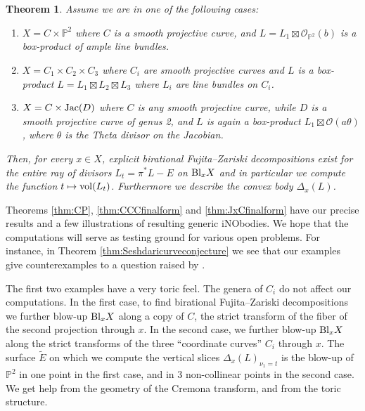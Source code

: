 \documentclass[12pt]{amsart}
\newtheorem{theorem}[lemma]{Theorem}
\theoremstyle{definition}
\newcommand{\bb}{\ensuremath{\mathfrak{b}}}
\newcommand{\nob}[2]{\ensuremath{\Delta_{#1}(#2)}}
\newcommand{\inob}[2]{\ensuremath{{\Delta}_{#1}(#2)}}
\newcommand{\?}{ \circled{{\large\bf ?}}}
\let\cal\mathcal
\let\bb\mathbb
\begin{document}
\begin{theorem}
	Assume we are in one of the following cases:
	\begin{enumerate}
		\item $X=C\times\bb P^2$ where $C$ is a smooth projective curve, and $L=L_1\boxtimes\cal O_{\bb P^2}(b)$ is a box-product of ample line bundles.
		\smallskip
		
		\item $X=C_1\times C_2\times C_3$ where $C_i$ are smooth projective curves and $L$ is a box-product $L=L_1\boxtimes L_2\boxtimes L_3$ where $L_i$ are line bundles on $C_i$.
		\smallskip
		
		\item $X=C\times {\rm Jac}(D)$ where $C$ is any smooth projective curve, while $D$ is a smooth projective curve of genus 2, and $L$ is again a box-product $L_1\boxtimes \cal O(a\theta)$, where $\theta$ is the Theta divisor on the Jacobian.
	\end{enumerate}
Then, for every $x\in X$, explicit birational Fujita--Zariski decompositions exist for the entire ray of divisors $L_t=\pi^*L-E$ on ${\rm Bl}_xX$ and in particular we compute the function $t\mapsto{\rm vol}(L_t)$. Furthermore we describe the convex body $\inob{x}{L}$. 
\end{theorem}


Theorems \ref{thm:CP}, \ref{thm:CCCfinalform} and \ref{thm:JxCfinalform} have our precise results and a few illustrations of resulting generic iNObodies. We hope that the computations will serve as testing ground for various open problems. For instance, in Theorem \ref{thm:Seshdaricurveconjecture} we see that our examples give counterexamples to a question raised by \cite{FLgeneralities}.

The first two examples have a very toric feel. The genera of $C_i$ do not affect our computations. In the first case, to find birational Fujita--Zariski decompositions we further blow-up ${\rm Bl}_xX$ along a copy of $C$, the strict transform of the fiber of the second projection through $x$. In the second case, we further blow-up ${\rm Bl}_xX$ along the strict transforms of the three ``coordinate curves'' $C_i$ through $x$. The surface $\widetilde E$ on which we compute the vertical slices $\nob{x}{L}_{\nu_1=t}$ is the blow-up of $\bb P^2$ in one point in the first case, and in $3$ non-collinear points in the second case. We get help from the geometry of the Cremona transform, and from the toric structure.
\end{document}

